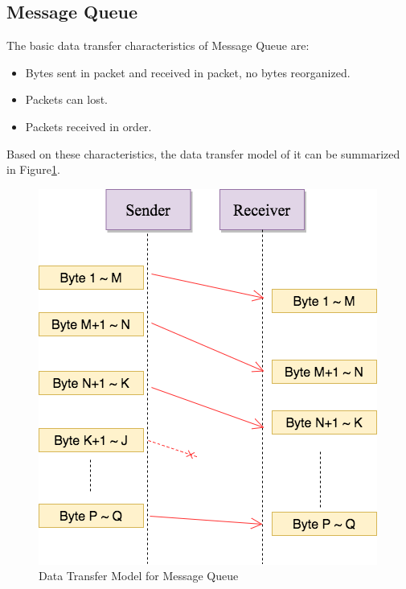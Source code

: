 \subsection{Message Queue}
The basic data transfer characteristics of Message Queue are:
\begin{itemize}
  \item Bytes sent in packet and received in packet, no bytes reorganized.
  \item Packets can lost.
  \item Packets received in order.
\end{itemize}
Based on these characteristics, the data transfer model of it can be summarized in Figure\ref{msmq}.
\begin{figure}[H]
\centerline{\includegraphics[scale=0.48]{Figures/msmq}}
\caption{Data Transfer Model for Message Queue}
\label{msmq}
\end{figure}

